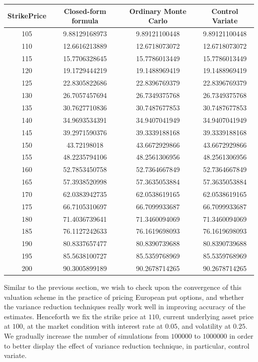 \begin{center}
\begin{tabular}{|c|c|c|c|}
\hline
StrikePrice & Closed-form formula & Ordinary Monte Carlo & Control Variate\\
\hline
105&9.88129168973 &9.89121100448 & 9.89121100448 \\
110&12.6616213889 &12.6718073072 & 12.6718073072 \\
115&15.7706328645 &15.7786013449 & 15.7786013449 \\
120&19.1729444219 &19.1488969419 & 19.1488969419 \\
125&22.8305822686 &22.8396769379 & 22.8396769379 \\
130&26.7057457694 &26.7349375768 & 26.7349375768 \\
135&30.7627710836 &30.7487677853 & 30.7487677853 \\
140&34.9693534391 &34.9407041949 & 34.9407041949 \\
145&39.2971590376 &39.3339188168 & 39.3339188168 \\
150&43.72198018 &  43.6672929866 & 43.6672929866 \\
155&48.2235794106 &48.2561306956 & 48.2561306956 \\
160&52.7853450758 &52.7364667849 & 52.7364667849 \\
165&57.3938520998 &57.3635053884 & 57.3635053884 \\
170&62.0383942735 &62.0538619165 & 62.0538619165 \\
175&66.7105310697 &66.7099933687 & 66.7099933687 \\
180&71.4036739641 &71.3460094069 & 71.3460094069 \\
185&76.1127242633 &76.1619698093 & 76.1619698093 \\
190&80.8337657477 &80.8390739688 & 80.8390739688 \\
195&85.5638100727 &85.5359768969 & 85.5359768969 \\
200&90.3005899189 &90.2678714265 & 90.2678714265 \\
\hline
\end{tabular}
\end{center}
\newpage
Similar to the previous section, we wish to check upon the convergence of this valuation scheme in the practice of pricing European put options, and whether the variance reduction techniques really work well in improving accuracy of the estimates. Henceforth we fix the strike price at $110$, current underlying asset price at $100$, at the market condition with interest rate at $0.05$, and volatility at $0.25$. We gradually increase the number of simulations from $100000$ to $1000000$ in order to better display the effect of variance reduction technique, in particular, control variate.
